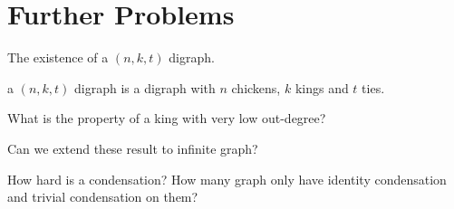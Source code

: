 \chapter{Further Problems}

The existence of a \((n, k, t)\) digraph.
\begin{definition}
  a \((n, k, t)\) digraph is a digraph with \(n\) chickens, \(k\) kings and \(t\) ties.
\end{definition}


What is the property of a king with very low out-degree?

Can we extend these result to infinite graph?

How hard is a condensation?
How many graph only have identity condensation
and trivial condensation on them?
